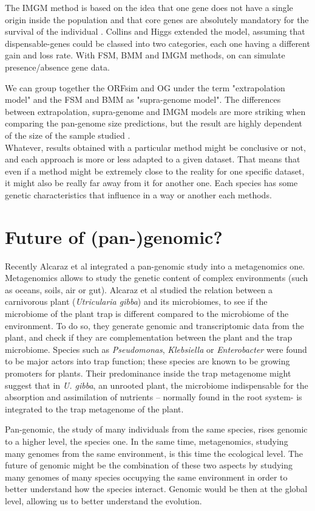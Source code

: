\documentclass[a4paper,10pt,twoside]{report}
\begin{document}
The IMGM method is based on the idea that one gene does not have a single origin inside the population and that core genes are absolutely mandatory for the survival of the individual \cite{Baumdicker2012}. Collins and Higgs \cite{Collins2012} extended the model, assuming that dispensable-genes could be classed into two categories, each one having a different gain and loss rate. With FSM, BMM and IMGM methods, on can simulate presence/absence gene data.

We can group together the ORFsim and OG under the term "extrapolation model" and the FSM and BMM as "supra-genome model". The differences between extrapolation, supra-genome and IMGM models are more striking when comparing the pan-genome size predictions, but the result are highly dependent of the size of the sample studied \cite{Baumdicker2012}.\\

Whatever, results obtained with a particular method might be conclusive or not, and each approach is more or less adapted to a given dataset. That means that even if a method might be extremely close to the reality for one specific dataset, it might also be really far away from it for another one. Each species has some genetic characteristics that influence in a way or another each methods.

\section{Future of (pan-)genomic?}
Recently Alcaraz et al \cite{Alcaraz2016} integrated a pan-genomic study into a metagenomics one. Metagenomics allows to study the genetic content of complex environments (such as oceans, soils, air or gut). Alcaraz et al \cite{Alcaraz2016} studied the relation between a carnivorous plant (\emph{Utricularia gibba}) and its microbiomes, to see if the microbiome of the plant trap is different compared to the microbiome of the environment. To do so, they generate genomic and transcriptomic data from the plant, and check if they are complementation between the plant and the trap microbiome. Species such as \emph{Pseudomonas}, \emph{Klebsiella} or \emph{Enterobacter} were found to be major actors into trap function; these species are known to be growing promoters for plants. Their predominance inside the trap metagenome might suggest that in \emph{U. gibba}, an unrooted plant, the microbiome indispensable for the absorption and assimilation of nutrients – normally found in the root system- is integrated to the trap metagenome of the plant.

Pan-genomic, the study of many individuals from the same species, rises genomic to a higher level, the species one. In the same time, metagenomics, studying many genomes from the same environment, is this time the ecological level. The future of genomic might be the combination of these two aspects by studying many genomes of many species occupying the same environment in order to better understand how the species interact. Genomic would be then at the global level, allowing us to better understand the evolution.


\end{document}
